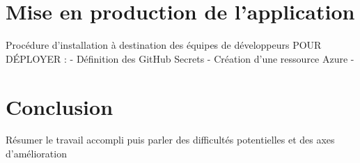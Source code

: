 \documentclass[french]{article}
\begin{document}
    
    \section{Mise en production de l'application}
    Procédure d'installation à destination des équipes de développeurs 
    POUR DÉPLOYER :
    - Définition des GitHub Secrets
    - Création d'une ressource Azure
    - 
    
    \newpage
    \section*{Conclusion}
    Résumer le travail accompli puis parler des difficultés potentielles et des axes d'amélioration
    
    


    
\end{document}
